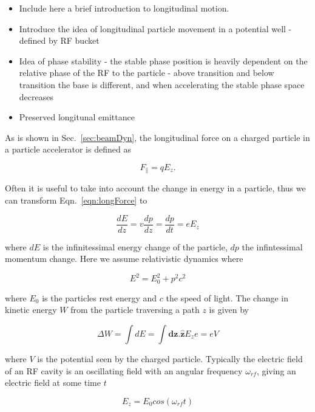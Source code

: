 \begin{itemize}
\item{Include here a brief introduction to longitudinal motion.}
\item{Introduce the idea of longitudinal particle movement in a potential well - defined by RF bucket}
\item{Idea of phase stability - the stable phase position is heavily dependent on the relative phase of the RF to the particle - above transition and below transition the base is different, and when accelerating the stable phase space decreases}
\item{Preserved longitunal emittance}
\end{itemize}

As is shown in Sec.~\ref{sec:beamDyn}, the longitudinal force on a charged particle in a particle accelerator is defined as 

\begin{equation}
F_{\parallel} = qE_{z}.
\label{eqn:longForce}
\end{equation}

Often it is useful to take into account the change in energy in a particle, thus we can transform Eqn.~\ref{eqn:longForce} to

\begin{equation}
\frac{dE}{dz} = v\frac{dp}{dz} = \frac{dp}{dt} = eE_{z}
\end{equation}

where $dE$ is the infinitessimal energy change of the particle, $dp$ the infintessimal momentum change. Here we assume relativistic dynamics where 

\begin{equation}
E^{2} = E_{0}^{2} + p^{2}c^{2}
\end{equation}

where $E_{0}$ is the particles rest energy and $c$ the speed of light. The change in kinetic energy $W$ from the particle traversing a path $z$ is given by

\begin{equation}
\Delta W = \int dE = \int \mathbf{dz}.\mathbf{\hat{z}} E_{z} e = eV
\end{equation}

where $V$ is the potential seen by the charged particle. Typically the electric field of an RF cavity is an oscillating field with an angular frequency $\omega_{rf}$, giving an electric field at some time $t$

\begin{equation}
E_{z} = E_{0} cos \left( \omega_{rf} t \right)
\end{equation}

